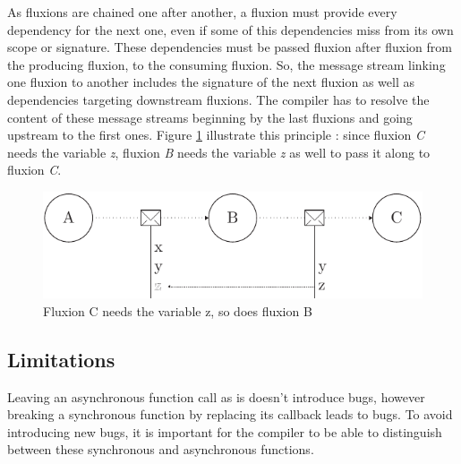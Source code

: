 As fluxions are chained one after another, a fluxion must provide every dependency for the next one, even if some of this dependencies miss from its own scope or signature.
These dependencies must be passed fluxion after fluxion from the producing fluxion, to the consuming fluxion.
So, the message stream linking one fluxion to another includes the signature of the next fluxion as well as dependencies targeting downstream fluxions.
The compiler has to resolve the content of these message streams beginning by the last fluxions and going upstream to the first ones.
Figure \ref{fig:streamline} illustrate this principle : since fluxion \textit{C} needs the variable \textit{z}, fluxion \textit{B} needs the variable \textit{z} as well to pass it along to fluxion \textit{C}.

\begin{figure}[h!]
  \includegraphics[width=\linewidth]{ressources/streamline.pdf}
  \caption{Fluxion C needs the variable z, so does fluxion B}
  \label{fig:streamline}
\end{figure}

\subsection{Limitations} \label{ss:Limitations}

Leaving an asynchronous function call as is doesn't introduce bugs, however breaking a synchronous function by replacing its callback leads to bugs.
To avoid introducing new bugs, it is important for the compiler to be able to distinguish between these synchronous and asynchronous functions.


